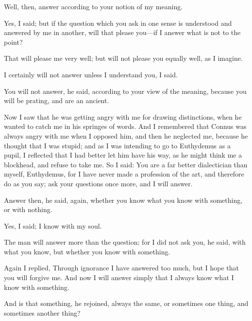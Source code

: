\documentclass[11pt,letter]{article}
\begin{document}
\par  Well, then, answer according to your notion of my meaning.

\par  Yes, I said; but if the question which you ask in one sense is understood and answered by me in another, will that please you—if I answer what is not to the point?

\par  That will please me very well; but will not please you equally well, as I imagine.

\par  I certainly will not answer unless I understand you, I said.

\par  You will not answer, he said, according to your view of the meaning, because you will be prating, and are an ancient.

\par  Now I saw that he was getting angry with me for drawing distinctions, when he wanted to catch me in his springes of words. And I remembered that Connus was always angry with me when I opposed him, and then he neglected me, because he thought that I was stupid; and as I was intending to go to Euthydemus as a pupil, I reflected that I had better let him have his way, as he might think me a blockhead, and refuse to take me. So I said: You are a far better dialectician than myself, Euthydemus, for I have never made a profession of the art, and therefore do as you say; ask your questions once more, and I will answer.

\par  Answer then, he said, again, whether you know what you know with something, or with nothing.

\par  Yes, I said; I know with my soul.

\par  The man will answer more than the question; for I did not ask you, he said, with what you know, but whether you know with something.

\par  Again I replied, Through ignorance I have answered too much, but I hope that you will forgive me. And now I will answer simply that I always know what I know with something.

\par  And is that something, he rejoined, always the same, or sometimes one thing, and sometimes another thing?
\end{document}
